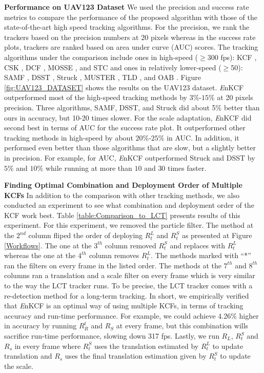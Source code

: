 \documentclass[10pt,twocolumn,letterpaper]{article}
\begin{document}
\textbf{Performance on UAV123 Dataset} We used the precision and
success rate metrics to compare the performance of the proposed
algorithm with those of the state-of-the-art high speed tracking
algorithms. For the precision, we rank the trackers based on the
precision numbers at 20 pixels whereas in the success rate plots,
trackers are ranked based on area under curve (AUC) scores. The
tracking algorithms under the comparison include ones in high-speed
($\geq$300 fps): KCF \cite{henriques2015high}, CSK
\cite{henriques2012exploiting}, DCF \cite{henriques2015high},
MOSSE \cite{bolme2010visual,henriques2015high}, and STC \cite{zhang2014fast} and ones in relatively
lower-speed ($\geq$50): SAMF \cite{li2014scale}, DSST
\cite{danelljan2014accurate}, Struck \cite{hare2012efficient}, MUSTER
\cite{hong2015multi}, TLD \cite{kalal2012tracking}, and OAB
\cite{zhang2012robust}. Figure \ref{fig:UAV123_DATASET} shows the
results on the UAV123 dataset. {\it E}nKCF outperformed most of the
high-speed tracking methods by $3\%$-$15\%$ at 20 pixels
precision. Three algorithms, SAMF, DSST, and Struck did about 5\%
better than ours in accuracy, but 10-20 times slower. For the scale
adaptation, {\it E}nKCF did second best in terms of AUC for the
success rate plot. It outperformed other tracking methods in
high-speed by about $20\%$-$25\%$ in AUC. In addition, it performed
even better than those algorithms that are slow, but a slightly better
in precision. For example, for AUC, {\it E}nKCF outperformed Struck
and DSST by $5\%$ and $10\%$ while running at more than $10$ and $30$
times faster.

\textbf{Finding Optimal Combination and Deployment Order of Multiple
  KCFs} In addition to the comparison with other tracking methods, we
also conducted an experiment to see what combination and deployment
order of the KCF work best. Table \ref{table:Comparison_to_LCT}
presents results of this experiment. For this experiment, we removed
the particle filter. The method at the $2^{nd}$ column fliped the
order of deploying $R_{t}^{L}$ and $R_{t}^{S}$ as presented at Figure
\ref{Workflows}. The one at the $3^{th}$ column removed $R_{t}^{S}$
and replaces with $R_{t}^{L}$ whereas the one at the $4^{th}$ column
removes $R_{t}^{L}$. The methods marked with ``*'' ran the filters on
every frame in the listed order. The methods at the $7^{th}$ and
$8^{th}$ columns ran a translation and a scale filter on every frame
which is very similar to the way the LCT tracker \cite{ma2015long}
runs. To be precise, the LCT tracker comes with a re-detection method
for a long-term tracking. In short, we empirically verified that
\textit{E}nKCF is an optimal way of using multiple KCFs, in terms of
tracking accuracy and run-time performance. For example, we could
achieve 4.26\% higher in accuracy by running $R_{R}^{t}$ and $R_{S}$
at every frame, but this combination wills sacrifice run-time
performance, slowing down 317 fps. Lastly, we run $R_{L}$, $R_{t}^{S}$
and $R_{s}$ in every frame where $R_{t}^{S}$ uses the translation
estimated by $R_{t}^{L}$ to update translation and $R_{s}$ uses the
final translation estimation given by $R_{t}^{S}$ to update the scale.
\end{document}
